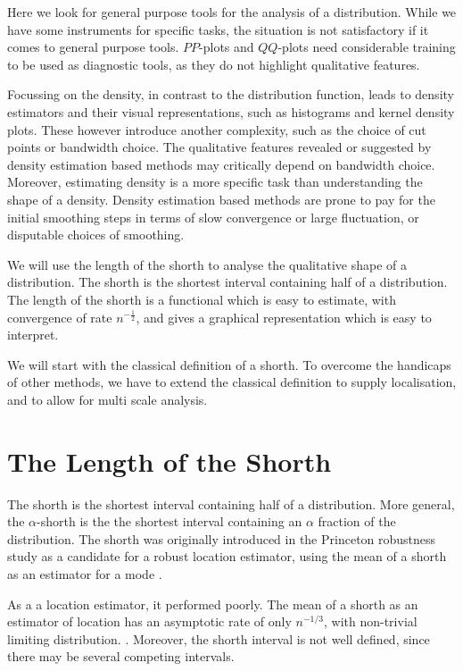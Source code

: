 \documentclass[dvips,12pt,a4paper,twoside]{amsart}
\begin{document}
Here we look for general purpose tools for the analysis of a distribution.
While we have some instruments for specific tasks, the situation is not satisfactory if it comes to general purpose tools. $PP$-plots and $QQ$-plots need considerable training to be used as diagnostic tools, as they do not highlight qualitative features. 

Focussing on the density, in contrast to the distribution function, leads to density estimators and their visual representations, such as histograms and kernel density plots. These however introduce another complexity, such as the choice of cut points or bandwidth choice. The qualitative features revealed or suggested by density estimation based methods may critically depend on bandwidth choice. Moreover, estimating density is a more specific task than understanding the shape of a density. Density estimation based methods are prone to pay for the initial smoothing steps in terms of slow convergence or large fluctuation, or disputable choices of smoothing.

We will use the length of the shorth to analyse the qualitative shape of a distribution. The shorth is the shortest interval containing half of a distribution. The length of the shorth is a functional which is easy to estimate, with convergence of rate $n^{-\frac{1}{2}}$, and gives a graphical representation which is easy to interpret. 

We will start with the classical definition of a shorth. To overcome the handicaps of other methods, we have to extend the classical definition to supply localisation, and to allow for multi scale analysis.

%
\section{The Length of the Shorth}
The shorth is the shortest interval containing half of a distribution. More general, the $\alpha$-shorth is the the shortest interval containing an $\alpha$ fraction of the distribution. The shorth was originally introduced in the Princeton robustness study as a candidate for a robust location estimator, using the mean of a shorth as an estimator for a mode \cite{ANDREWSD1972Robust-Estimati}. 

As a a location estimator, it performed poorly. The mean of a shorth as an estimator of
location has an asymptotic rate of only $n ^{-1/ 3}$,
with non-trivial limiting
distribution. 
\cite[p. 50]{ANDREWSD1972Robust-Estimati}  \cite[p. 767]{Shorack1986Empirical-proce}. Moreover, the shorth interval is not well defined, since there may be several competing intervals. 
\end{document}
